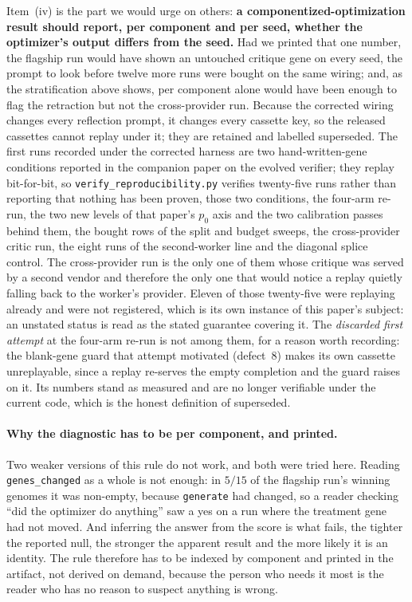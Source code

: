 \documentclass[11pt]{article}
\begin{document}
Item~(iv) is the part we would urge on others: \textbf{a
componentized-optimization result should report, per component and per seed, whether the
optimizer's output differs from the seed.} Had we printed that one number, the flagship run
would have shown an untouched critique gene on every seed, the prompt to look before twelve
more runs were bought on the same wiring; and, as the stratification above shows, per component
alone would have been enough to flag the retraction but not the cross-provider run. Because
the corrected wiring changes every reflection prompt, it changes every cassette key, so the
released cassettes cannot replay under it; they are retained and labelled superseded. The
first runs recorded under the corrected harness are two hand-written-gene conditions reported in
the companion paper on the evolved verifier; they replay bit-for-bit, so \texttt{verify\_reproducibility.py}
verifies twenty-five runs rather than reporting that nothing has been proven, those two
conditions, the four-arm re-run, the two new levels of that paper's $p_0$
axis and the two calibration passes behind
them, the bought rows of the split and budget sweeps, the cross-provider critic run, the
eight runs of the second-worker line and the diagonal splice control. The cross-provider run is the only one of them whose critique
was served by a second vendor and therefore the only one that would notice a replay quietly
falling back to the worker's provider. Eleven of those twenty-five were replaying already and
were not registered, which is its own instance of this paper's subject: an unstated
status is read as the stated guarantee covering it.
The \emph{discarded first attempt} at the four-arm re-run is not among them,
for a reason worth recording: the blank-gene guard that attempt motivated (defect~8) makes
its own cassette unreplayable, since a replay re-serves the empty completion and the guard
raises on it. Its numbers stand as measured and are no longer verifiable under the current
code, which is the honest definition of superseded.

\paragraph{Why the diagnostic has to be per component, and printed.}
Two weaker versions of this rule do not work, and both were tried here. Reading
\texttt{genes\_changed} as a whole is not enough: in $5/15$ of the flagship run's winning
genomes it was non-empty, because \texttt{generate} had changed, so a reader checking ``did the optimizer do
anything'' saw a yes on a run where the treatment gene had not moved. And inferring the answer
from the score is what fails, the tighter the reported null, the stronger the
apparent result and the more likely it is an identity. The rule therefore has to be indexed by
component and printed in the artifact, not derived on demand, because the person who needs it
most is the reader who has no reason to suspect anything is wrong.
\end{document}
